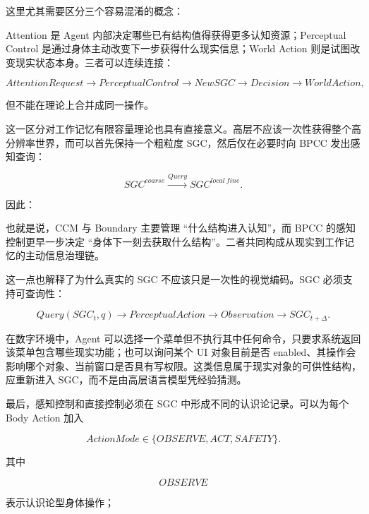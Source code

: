 这里尤其需要区分三个容易混淆的概念：

\begin{statementbox}
\centering
{}
\end{statementbox}

Attention 是 Agent 内部决定哪些已有结构值得获得更多认知资源；Perceptual Control 是通过身体主动改变下一步获得什么现实信息；World Action 则是试图改变现实状态本身。三者可以连续连接：

\[
AttentionRequest
\rightarrow
PerceptualControl
\rightarrow
NewSGC
\rightarrow
Decision
\rightarrow
WorldAction,
\]

但不能在理论上合并成同一操作。

这一区分对工作记忆有限容量理论也具有直接意义。高层不应该一次性获得整个高分辨率世界，而可以首先保持一个粗粒度 SGC，然后仅在必要时向 BPCC 发出感知查询：

\[
SGC^{coarse}
\xrightarrow{Query}
SGC^{local\ fine}.
\]

因此：

\begin{statementbox}
\centering
{}
\end{statementbox}

也就是说，CCM 与 Boundary 主要管理 ``什么结构进入认知''，而 BPCC 的感知控制更早一步决定 ``身体下一刻去获取什么结构''。二者共同构成从现实到工作记忆的主动信息治理链。

这一点也解释了为什么真实的 SGC 不应该只是一次性的视觉编码。SGC 必须支持可查询性：

\[
Query(SGC_t,q)
\rightarrow
PerceptualAction
\rightarrow
Observation
\rightarrow
SGC_{t+\Delta}.
\]

在数字环境中，Agent 可以选择一个菜单但不执行其中任何命令，只要求系统返回该菜单包含哪些现实功能；也可以询问某个 UI 对象目前是否 enabled、其操作会影响哪个对象、当前窗口是否具有写权限。这类信息属于现实对象的可供性结构，应重新进入 SGC，而不是由高层语言模型凭经验猜测。

最后，感知控制和直接控制必须在 SGC 中形成不同的认识论记录。可以为每个 Body Action 加入

\[
ActionMode
\in
\{
OBSERVE,
ACT,
SAFETY
\}.
\]

其中

\[
OBSERVE
\]

表示认识论型身体操作；

